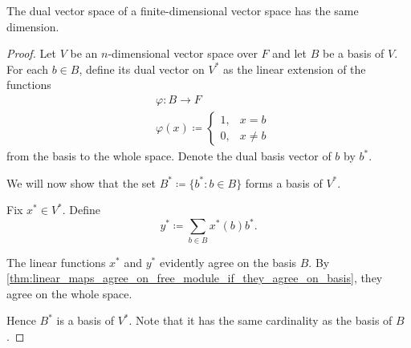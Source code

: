 \begin{proposition}\label{thm:finite_dimensional_dual_space_is_isomorphic}
  The dual vector space of a finite-dimensional vector space has the same dimension.
\end{proposition}
\begin{proof}
  Let \( V \) be an \( n \)-dimensional vector space over \( F \) and let \( B \) be a basis of \( V \). For each \( b \in B \), define its dual vector on \( V^* \) as the linear extension of the functions
  \begin{align*}
    &\varphi: B \to F \\
    &\varphi(x) \coloneqq \begin{cases}
      1, &x = b \\
      0, &x \neq b
    \end{cases}
  \end{align*}
  from the basis to the whole space. Denote the dual basis vector of \( b \) by \( b^* \).

  We will now show that the set \( B^* \coloneqq \{ b^* \colon b \in B \} \) forms a basis of \( V^* \).

  Fix \( x^* \in V^* \). Define
  \begin{equation*}
    y^* \coloneqq \sum_{b \in B} x^*(b) b^*.
  \end{equation*}

  The linear functions \( x^* \) and \( y^* \) evidently agree on the basis \( B \). By \cref{thm:linear_maps_agree_on_free_module_if_they_agree_on_basis}, they agree on the whole space.

  Hence \( B^* \) is a basis of \( V^* \). Note that it has the same cardinality as the basis of \( B \).
\end{proof}


